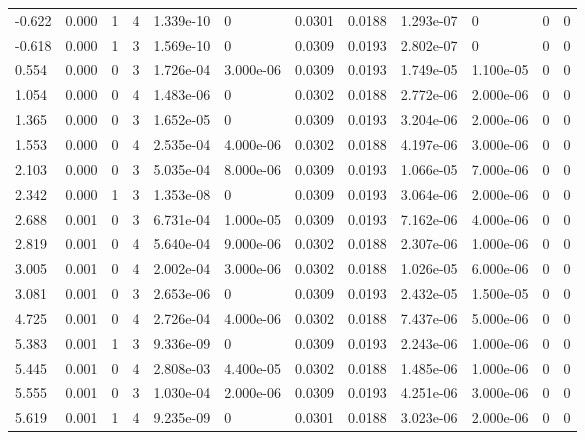 \documentclass[preview]{standalone}
\begin{document}
{{\begin{tabular}{L{1.2cm}C{1.2cm} C{0.3cm}C{0.5cm} C{1.4cm}C{1.4cm} C{1.4cm}C{1.4cm} C{1.6cm}C{1.6cm} C{1.6cm}C{1.6cm}}
  -0.622  &  0.000  & 1     &  4 &  1.339e-10  & 0  &  0.0301&   0.0188& 1.293e-07 & 0   &  0 & 0  \\ 
  -0.618  &  0.000  & 1     &  3 &  1.569e-10  & 0  &  0.0309&   0.0193& 2.802e-07 & 0   &  0 & 0  \\ 
  0.554  &  0.000  & 0     &  3 &  1.726e-04  & 3.000e-06  &  0.0309&   0.0193& 1.749e-05 & 1.100e-05   &  0 & 0  \\ 
  1.054  &  0.000  & 0     &  4 &  1.483e-06  & 0  &  0.0302&   0.0188& 2.772e-06 & 2.000e-06   &  0 & 0  \\ 
  1.365  &  0.000  & 0     &  3 &  1.652e-05  & 0  &  0.0309&   0.0193& 3.204e-06 & 2.000e-06   &  0 & 0  \\ 
  1.553  &  0.000  & 0     &  4 &  2.535e-04  & 4.000e-06  &  0.0302&   0.0188& 4.197e-06 & 3.000e-06   &  0 & 0  \\ 
  2.103  &  0.000  & 0     &  3 &  5.035e-04  & 8.000e-06  &  0.0309&   0.0193& 1.066e-05 & 7.000e-06   &  0 & 0  \\ 
  2.342  &  0.000  & 1     &  3 &  1.353e-08  & 0  &  0.0309&   0.0193& 3.064e-06 & 2.000e-06   &  0 & 0  \\ 
  2.688  &  0.001  & 0     &  3 &  6.731e-04  & 1.000e-05  &  0.0309&   0.0193& 7.162e-06 & 4.000e-06   &  0 & 0  \\ 
  2.819  &  0.001  & 0     &  4 &  5.640e-04  & 9.000e-06  &  0.0302&   0.0188& 2.307e-06 & 1.000e-06   &  0 & 0  \\ 
  3.005  &  0.001  & 0     &  4 &  2.002e-04  & 3.000e-06  &  0.0302&   0.0188& 1.026e-05 & 6.000e-06   &  0 & 0  \\ 
  3.081  &  0.001  & 0     &  3 &  2.653e-06  & 0  &  0.0309&   0.0193& 2.432e-05 & 1.500e-05   &  0 & 0  \\ 
  4.725  &  0.001  & 0     &  4 &  2.726e-04  & 4.000e-06  &  0.0302&   0.0188& 7.437e-06 & 5.000e-06   &  0 & 0  \\ 
  5.383  &  0.001  & 1     &  3 &  9.336e-09  & 0  &  0.0309&   0.0193& 2.243e-06 & 1.000e-06   &  0 & 0  \\ 
  5.445  &  0.001  & 0     &  4 &  2.808e-03  & 4.400e-05  &  0.0302&   0.0188& 1.485e-06 & 1.000e-06   &  0 & 0  \\ 
  5.555  &  0.001  & 0     &  3 &  1.030e-04  & 2.000e-06  &  0.0309&   0.0193& 4.251e-06 & 3.000e-06   &  0 & 0  \\ 
  5.619  &  0.001  & 1     &  4 &  9.235e-09  & 0  &  0.0301&   0.0188& 3.023e-06 & 2.000e-06   &  0 & 0  \\ 

\end{tabular}}}
\end{document}
